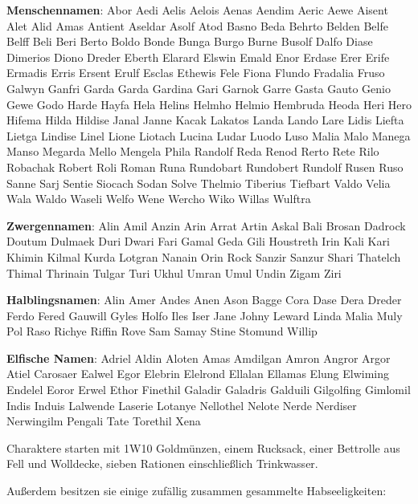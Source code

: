 \documentclass[11pt]{wbzine}
\begin{document}
\begin{multicols}{2}
\textbf{Menschennamen}:
Abor
Aedi
Aelis
Aelois
Aenas
Aendim
Aeric
Aewe
Aisent
Alet
Alid
Amas
Antient
Aseldar
Asolf
Atod
Basno
Beda
Behrto
Belden
Belfe
Belff
Beli
Beri
Berto
Boldo
Bonde
Bunga
Burgo
Burne
Busolf
Dalfo
Diase
Dimerios
Diono
Dreder
Eberth
Elarard
Elswin
Emald
Enor
Erdase
Erer
Erife
Ermadis
Erris
Ersent
Erulf
Esclas
Ethewis
Fele
Fiona
Flundo
Fradalia
Fruso
Galwyn
Ganfri
Garda
Garda
Gardina
Gari
Garnok
Garre
Gasta
Gauto
Genio
Gewe
Godo
Harde
Hayfa
Hela
Helins
Helmho
Helmio
Hembruda
Heoda
Heri
Hero
Hifema
Hilda
Hildise
Janal
Janne
Kacak
Lakatos
Landa
Lando
Lare
Lidis
Liefta
Lietga
Lindise
Linel
Lione
Liotach
Lucina
Ludar
Luodo
Luso
Malia
Malo
Manega
Manso
Megarda
Mello
Mengela
Phila
Randolf
Reda
Renod
Rerto
Rete
Rilo
Robachak
Robert
Roli
Roman
Runa
Rundobart
Rundobert
Rundolf
Rusen
Ruso
Sanne
Sarj
Sentie
Siocach
Sodan
Solve
Thelmio
Tiberius
Tiefbart
Valdo
Velia
Wala
Waldo
Waseli
Welfo
Wene
Wercho
Wiko
Willas
Wulftra

\textbf{Zwergennamen}:
Alin
Amil
Anzin
Arin
Arrat
Artin
Askal
Bali
Brosan
Dadrock
Doutum
Dulmaek
Duri
Dwari
Fari
Gamal
Geda
Gili
Houstreth
Irin
Kali
Kari
Khimin
Kilmal
Kurda
Lotgran
Nanain
Orin
Rock
Sanzir
Sanzur
Shari
Thatelch
Thimal
Thrinain
Tulgar
Turi
Ukhul
Umran
Umul
Undin
Zigam
Ziri

\textbf{Halblingsnamen}:
Alin
Amer
Andes
Anen
Ason
Bagge
Cora
Dase
Dera
Dreder
Ferdo
Fered
Gauwill
Gyles
Holfo
Iles
Iser
Jane
Johny
Leward
Linda
Malia
Muly
Pol
Raso
Richye
Riffin
Rove
Sam
Samay
Stine
Stomund
Willip

\textbf{Elfische Namen}:
Adriel
Aldin
Aloten
Amas
Amdilgan
Amron
Angror
Argor
Atiel
Carosaer
Ealwel
Egor
Elebrin
Elelrond
Ellalan
Ellamas
Elung
Elwiming
Endelel
Eoror
Erwel
Ethor
Finethil
Galadir
Galadris
Galduili
Gilgolfing
Gimlomil
Indis
Induis
Lalwende
Laserie
Lotanye
Nellothel
Nelote
Nerde
Nerdiser
Nerwingilm
Pengali
Tate
Torethil
Xena

\begin{tcolorbox}
Charaktere starten mit 1W10 Goldmünzen, einem Rucksack, einer
Bettrolle aus Fell und Wolldecke, sieben Rationen einschließlich
Trinkwasser.
\end{tcolorbox}

Außerdem besitzen sie einige zufällig zusammen gesammelte
Habseeligkeiten:


\end{multicols}
\end{document}
